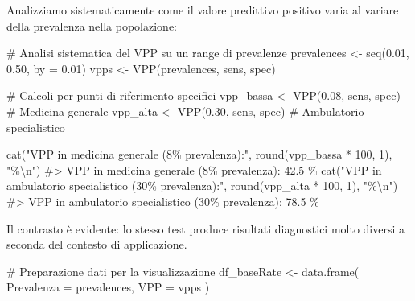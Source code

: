 \documentclass[
  letterpaper,
  DIV=11,
  numbers=noendperiod,
  oneside]{scrreprt}
\newenvironment{Shaded}{\begin{snugshade}}{\end{snugshade}}
\newcommand{\AttributeTok}[1]{\textcolor[rgb]{0.40,0.45,0.13}{#1}}
\newcommand{\CommentTok}[1]{\textcolor[rgb]{0.37,0.37,0.37}{#1}}
\newcommand{\DecValTok}[1]{\textcolor[rgb]{0.68,0.00,0.00}{#1}}
\newcommand{\FloatTok}[1]{\textcolor[rgb]{0.68,0.00,0.00}{#1}}
\newcommand{\FunctionTok}[1]{\textcolor[rgb]{0.28,0.35,0.67}{#1}}
\newcommand{\NormalTok}[1]{\textcolor[rgb]{0.00,0.23,0.31}{#1}}
\newcommand{\OtherTok}[1]{\textcolor[rgb]{0.00,0.23,0.31}{#1}}
\newcommand{\SpecialCharTok}[1]{\textcolor[rgb]{0.37,0.37,0.37}{#1}}
\newcommand{\StringTok}[1]{\textcolor[rgb]{0.13,0.47,0.30}{#1}}
\theoremstyle{definition}
\theoremstyle{plain}
\theoremstyle{definition}
\theoremstyle{remark}
\begin{document}
\begin{tcolorbox}
Analizziamo sistematicamente come il valore predittivo positivo varia al
variare della prevalenza nella popolazione:

\begin{Shaded}
\begin{Highlighting}[]
\CommentTok{\# Analisi sistematica del VPP su un range di prevalenze}
\NormalTok{prevalences }\OtherTok{\textless{}{-}} \FunctionTok{seq}\NormalTok{(}\FloatTok{0.01}\NormalTok{, }\FloatTok{0.50}\NormalTok{, }\AttributeTok{by =} \FloatTok{0.01}\NormalTok{)}
\NormalTok{vpps }\OtherTok{\textless{}{-}} \FunctionTok{VPP}\NormalTok{(prevalences, sens, spec)}

\CommentTok{\# Calcoli per punti di riferimento specifici}
\NormalTok{vpp\_bassa }\OtherTok{\textless{}{-}} \FunctionTok{VPP}\NormalTok{(}\FloatTok{0.08}\NormalTok{, sens, spec)  }\CommentTok{\# Medicina generale}
\NormalTok{vpp\_alta }\OtherTok{\textless{}{-}} \FunctionTok{VPP}\NormalTok{(}\FloatTok{0.30}\NormalTok{, sens, spec)   }\CommentTok{\# Ambulatorio specialistico}

\FunctionTok{cat}\NormalTok{(}\StringTok{"VPP in medicina generale (8\% prevalenza):"}\NormalTok{, }\FunctionTok{round}\NormalTok{(vpp\_bassa }\SpecialCharTok{*} \DecValTok{100}\NormalTok{, }\DecValTok{1}\NormalTok{), }\StringTok{"\%}\SpecialCharTok{\textbackslash{}n}\StringTok{"}\NormalTok{)}
\CommentTok{\#\textgreater{} VPP in medicina generale (8\% prevalenza): 42.5 \%}
\FunctionTok{cat}\NormalTok{(}\StringTok{"VPP in ambulatorio specialistico (30\% prevalenza):"}\NormalTok{, }\FunctionTok{round}\NormalTok{(vpp\_alta }\SpecialCharTok{*} \DecValTok{100}\NormalTok{, }\DecValTok{1}\NormalTok{), }\StringTok{"\%}\SpecialCharTok{\textbackslash{}n}\StringTok{"}\NormalTok{)}
\CommentTok{\#\textgreater{} VPP in ambulatorio specialistico (30\% prevalenza): 78.5 \%}
\end{Highlighting}
\end{Shaded}

Il contrasto è evidente: lo stesso test produce risultati diagnostici
molto diversi a seconda del contesto di applicazione.

\begin{Shaded}
\begin{Highlighting}[]
\CommentTok{\# Preparazione dati per la visualizzazione}
\NormalTok{df\_baseRate }\OtherTok{\textless{}{-}} \FunctionTok{data.frame}\NormalTok{(}
  \AttributeTok{Prevalenza =}\NormalTok{ prevalences,}
  \AttributeTok{VPP =}\NormalTok{ vpps}
\NormalTok{)}


\end{Highlighting}
\end{Shaded}
\end{tcolorbox}
\end{document}
